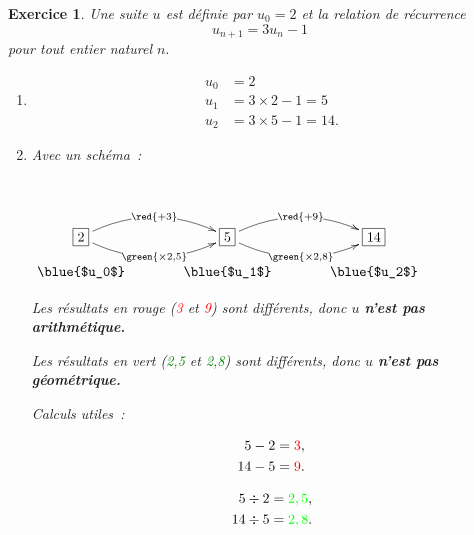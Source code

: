 \documentclass[10pt]{article}
\newtheorem{exo}{Exercice}
\begin{document}
\begin{exo}

Une suite $u$ est définie par $u_0=2$ et la relation de récurrence \[u_{n+1}=3u_n-1\] pour tout entier naturel $n.$

\begin{enumerate}
\item \begin{align*}
u_0&=2\\
u_1&=3\times 2-1=5\\
u_2&=3\times 5-1=14.\end{align*}


\item Avec un schéma~:

\setlength{\columnseprule}{1pt}

\begin{multicols}{2}
~{}\begin{center}
    $\xymatrix@R=0.5pc@C=3pc{
    *+[F]+{2} \ar@/^0.5cm/[r]|{\red{+3}} \ar@/_0.5cm/[r]|{\green{\times 2,5}} & 
    *+[F]+{5} \ar@/^0.5cm/[r]|{\red{+9}} \ar@/_0.5cm/[r]|{\green{\times 2,8}} & *+[F]+{14} \\
    \txt{\blue{$u_0$}}&
    \txt{\blue{$u_1$}}&\txt{\blue{$u_2$}}    
    }$
    \end{center}
    
    
    \medskip
    
    Les résultats en rouge (\textcolor{red}{3} et \textcolor{red}{9}) sont différents, donc $u$ \textbf{n'est pas arithmétique.}
    
    \medskip
    
    Les résultats en vert (\textcolor{green}{2,5} et \textcolor{green}{2,8}) sont différents, donc $u$ \textbf{n'est pas géométrique.}
    
  \columnbreak
  
  Calculs utiles~:
  
  \medskip
  
  \begin{align*}
  5-2&=\textcolor{red}{3},\\
  14-5&= \textcolor{red}{9}.
  \end{align*}
  
  \medskip
  
  \begin{align*}
  5\div 2&=\textcolor{green}{2,5},\\
  14\div 5&= \textcolor{green}{2,8}.
  \end{align*}
  
  \end{multicols}


\end{enumerate}
\end{exo}
\end{document}
